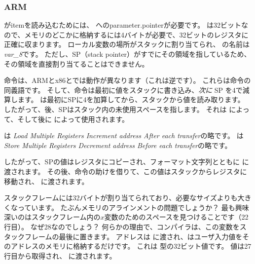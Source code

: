 \subsubsection{ARM}

\myparagraph{\OptimizingKeilVI (\ThumbMode)}



\myindex{\CLanguageElements!\Pointers}

\scanf がitemを読み込むためには、 \Tint へのparameter.pointerが必要です。 
\Tint は32ビットなので、メモリのどこかに格納するには4バイトが必要で、32ビットのレジスタに正確に収まります。 
ローカル変数の場所がスタックに割り当てられ、 
\IDA の名前は\emph{var\_8}です。 ただし、\ac{SP}（\gls{stack pointer}）がすでにその領域を指しているため、その領域を直接割り当てることはできません。 

命令は、ARMとx86とでは動作が異なります（これは逆です）。 
これらは命令の同義語です。 
そして、命令は最初に値をスタックに書き込み、\emph{次に} \ac{SP} を4で減算します。
は最初に\ac{SP}に4を加算してから、スタックから値を読み取ります。 
したがって、後、\ac{SP}はスタック内の未使用スペースを指します。 
それは \scanf によって、そして後に \printf によって使用されます。

 は \emph{Load Multiple Registers Increment address After each transfer}の略です。
 は \emph{Store Multiple Registers Decrement address Before each transfer}の略です。

したがって、\ac{SP}の値はレジスタにコピーされ、フォーマット文字列とともに \scanf に渡されます。 
その後、命令の助けを借りて、この値はスタックからレジスタに移動され、 \printf に渡されます。




スタックフレームには32バイトが割り当てられており、必要なサイズよりも大きくなっています。 たぶんメモリのアラインメントの問題でしょうか？ 
最も興味深いのはスタックフレーム内の$x$変数のためのスペースを見つけることです（22行目）。 
なぜ28なのでしょう？ 何らかの理由で、コンパイラは、この変数をスタックフレームの最後に置きます。 
アドレスは \scanf に渡され、\scanf はユーザ入力値をそのアドレスのメモリに格納するだけです。 
これは \Tint 型の32ビット値です。 
値は27行目から取得され、 \printf に渡されます。
